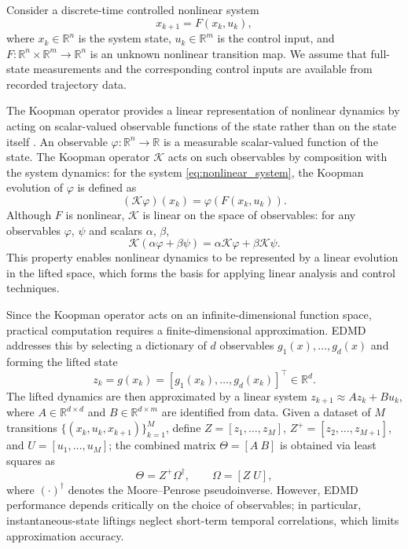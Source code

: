 \documentclass[journal]{IEEEtran}
\begin{document}
Consider a discrete-time controlled nonlinear system
\begin{equation}
    x_{k+1} = F(x_k, u_k),
    \label{eq:nonlinear_system}
\end{equation}
where $x_k \in \mathbb{R}^n$ is the system state, $u_k \in \mathbb{R}^m$ is the control input, and $F:\mathbb{R}^n \times \mathbb{R}^m \to \mathbb{R}^n$ is an unknown nonlinear transition map. We assume that full-state measurements and the corresponding control inputs are available from recorded trajectory data.

The Koopman operator provides a linear representation of nonlinear dynamics by acting on scalar-valued observable functions of the state rather than on the state itself \cite{koopman1931hamiltonian, mezic2005spectral, rowley2009spectral, brunton2022modern}. An observable $\varphi:\mathbb{R}^n\to\mathbb{R}$ is a measurable scalar-valued function of the state. The Koopman operator $\mathcal{K}$ acts on such observables by composition with the system dynamics: for the system \eqref{eq:nonlinear_system}, the Koopman evolution of $\varphi$ is defined as
\begin{equation}
    (\mathcal{K}\varphi)(x_k) = \varphi(F(x_k,u_k)).
    \label{eq:koopman_operator}
\end{equation}
Although $F$ is nonlinear, $\mathcal{K}$ is linear on the space of observables: for any observables $\varphi$, $\psi$ and scalars $\alpha$, $\beta$,
\begin{equation}
    \mathcal{K}(\alpha \varphi + \beta \psi)
    = \alpha \mathcal{K}\varphi + \beta \mathcal{K}\psi.
    \label{eq:koopman_linearity}
\end{equation}
This property enables nonlinear dynamics to be represented by a linear evolution in the lifted space, which forms the basis for applying linear analysis and control techniques.

Since the Koopman operator acts on an infinite-dimensional function space, practical computation requires a finite-dimensional approximation. EDMD addresses this by selecting a dictionary of $d$ observables $g_1(x),\ldots,g_d(x)$ and forming the lifted state
\begin{equation}
    z_k = g(x_k) = [g_1(x_k), \ldots, g_d(x_k)]^\top \in \mathbb{R}^d.
    \label{eq:instantaneous_lifting}
\end{equation}
The lifted dynamics are then approximated by a linear system $z_{k+1} \approx A z_k + B u_k$, where $A \in \mathbb{R}^{d \times d}$ and $B \in \mathbb{R}^{d \times m}$ are identified from data. Given a dataset of $M$ transitions $\{(x_k, u_k, x_{k+1})\}_{k=1}^M$, define $Z = [z_1,\ldots,z_M]$, $Z^+ = [z_2,\ldots,z_{M+1}]$, and $U = [u_1,\ldots,u_M]$; the combined matrix $\Theta = [A\ B]$ is obtained via least squares as
\begin{equation}
    \Theta = Z^+ \Omega^\dagger, \qquad \Omega = [Z\; U],
    \label{eq:edmd_regression}
\end{equation}
where $(\cdot)^\dagger$ denotes the Moore--Penrose pseudoinverse. However, EDMD performance depends critically on the choice of observables; in particular, instantaneous-state liftings neglect short-term temporal correlations, which limits approximation accuracy.
\end{document}
